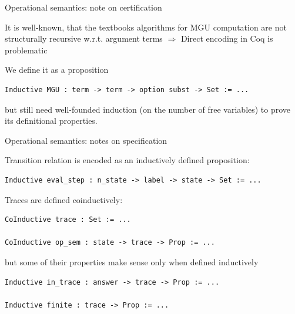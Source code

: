 \documentclass{beamer}
\let\\\tabularnewline
\let\\\tabularnewline
\theoremstyle{definition}
\theoremstyle{plain} %
\begin{document}
\begin{frame}[fragile]{Operational semantics: note on certification}

It is well-known, that the textbooks algorithms for MGU computation are not structurally recursive w.r.t. argument terms \\ $\Rightarrow$ \\ Direct encoding in Coq is problematic

\vskip5mm

We define it as a proposition
\begin{lstlisting}
Inductive MGU : term -> term -> option subst -> Set := ...
\end{lstlisting}

\vskip5mm

but still need well-founded induction (on the number of free variables) to prove its definitional properties.

\end{frame}



\begin{frame}[fragile]{Operational semantics: notes on specification}

Transition relation is encoded as an inductively defined proposition:
\begin{lstlisting}
Inductive eval_step : n_state -> label -> state -> Set := ...
\end{lstlisting}

\pause

\vskip5mm

Traces are defined coinductively:
\begin{lstlisting}
CoInductive trace : Set := ...

CoInductive op_sem : state -> trace -> Prop := ...
\end{lstlisting}

\vskip3mm

but some of their properties make sense only when defined inductively
\begin{lstlisting}
Inductive in_trace : answer -> trace -> Prop := ...

Inductive finite : trace -> Prop := ...
\end{lstlisting}

\end{frame}
\end{document}
